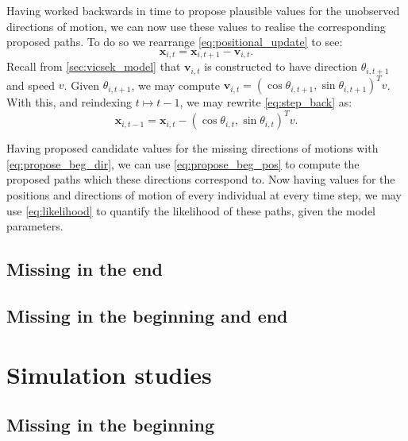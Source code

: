 Having worked backwards in time to propose plausible values for the unobserved
directions of motion, we can now use these values to realise the corresponding
proposed paths. To do so we rearrange \cref{eq:positional_update} to see:
\begin{equation}
  \label{eq:step_back}
  \bm{x}_{i,t} = \bm{x}_{i,t+1} - \bm{v}_{i,t}.
\end{equation}
Recall from \cref{sec:vicsek_model} that $\bm{v}_{i,t}$ is constructed to have
direction $\theta_{i,t+1}$ and speed $v$. Given $\theta_{i,t+1}$, we may
compute $\bm{v}_{i,t} = (\cos\theta_{i,t+1}, \sin\theta_{i,t+1})^Tv$. With
this, and reindexing $t\mapsto t-1$, we may rewrite \cref{eq:step_back} as:
\begin{equation}
  \label{eq:propose_beg_pos}
  \bm{x}_{i,t-1} = \bm{x}_{i,t} - (\cos\theta_{i,t}, \sin\theta_{i,t})^Tv.
\end{equation}

Having proposed candidate values for the missing directions of motions with
\cref{eq:propose_beg_dir}, we can use \cref{eq:propose_beg_pos} to compute
the proposed paths which these directions correspond to. Now having values for the
positions and directions of motion of every individual at every time step, we
may use \cref{eq:likelihood} to quantify the likelihood of these paths, given
the model parameters.

\subsection{Missing in the end}

\subsection{Missing in the beginning and end}

\section{Simulation studies}

\subsection{Missing in the beginning}

